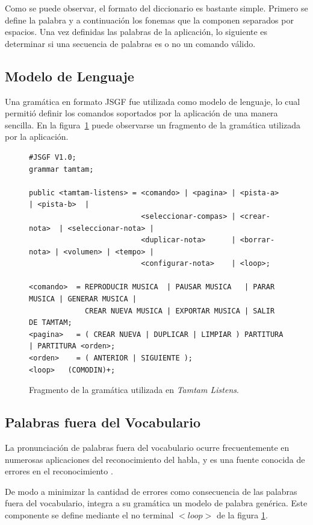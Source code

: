 Como se puede observar, el formato del diccionario es bastante simple. Primero se define la palabra y 
a continuaci\'on los fonemas que la componen separados por espacios.
Una vez definidas las palabras de la aplicaci\'on, lo siguiente es determinar si una secuencia de
palabras es o no un comando v\'alido.

\subsection{Modelo de Lenguaje}
\label{sec:lenguaje-solucion}

Una gram\'atica en formato JSGF \cite{JSGF2000} fue utilizada como modelo de lenguaje, lo cual permiti\'o
definir los comandos soportados por la aplicaci\'on de una manera sencilla.
En la figura~\ref{figure:fragmento-gram} puede observarse un fragmento de la gram\'atica utilizada por 
la aplicaci\'on.

\begin{figure}[H]
\begin{lstlisting}
#JSGF V1.0;
grammar tamtam;

public <tamtam-listens> = <comando> | <pagina> | <pista-a>     | <pista-b>  | 
                          <seleccionar-compas> | <crear-nota>  | <seleccionar-nota> | 
                          <duplicar-nota>      | <borrar-nota> | <volumen> | <tempo> | 
                          <configurar-nota>    | <loop>;

<comando>  = REPRODUCIR MUSICA  | PAUSAR MUSICA   | PARAR MUSICA | GENERAR MUSICA | 
             CREAR NUEVA MUSICA | EXPORTAR MUSICA | SALIR DE TAMTAM;
<pagina>   = ( CREAR NUEVA | DUPLICAR | LIMPIAR ) PARTITURA | PARTITURA <orden>;
<orden>    = ( ANTERIOR | SIGUIENTE );
<loop>   (COMODIN)+;
\end{lstlisting}
\caption{Fragmento de la gram\'atica utilizada en \emph{Tamtam Listens}.}
\label{figure:fragmento-gram}
\end{figure} 


\subsection{Palabras fuera del Vocabulario}
\label{sec:oov}

La pronunciaci\'on de palabras fuera del vocabulario ocurre frecuentemente en numerosas aplicaciones
del reconocimiento del habla, y es una fuente conocida de errores en el reconocimiento \cite{Bazzi00Modeling}.

De modo a minimizar la cantidad de errores como consecuencia de las palabras fuera del vocabulario,
 integra a su gram\'atica un modelo de palabra gen\'erica. Este componente se
define mediante el no terminal $<loop>$ de la figura \ref{figure:fragmento-gram}.

